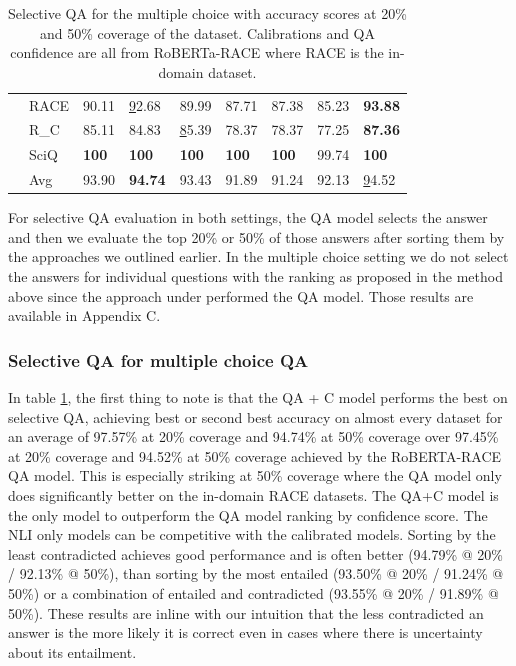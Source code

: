 \documentclass[11pt]{article}
\begin{document}
\begin{table}[]
\begin{tabular}{lllllllll}
 & RACE & 90.11 & {\ul 92.68} & 89.99 & 87.71 & 87.38 & 85.23 & \textbf{93.88} \\
 & R\_C & 85.11 & 84.83 & {\ul 85.39} & 78.37 & 78.37 & 77.25 & \textbf{87.36} \\
 & SciQ & \textbf{100} & \textbf{100} & \textbf{100} & \textbf{100} & \textbf{100} & 99.74 & \textbf{100} \\
 & Avg & 93.90 & \textbf{94.74} & 93.43 & 91.89 & 91.24 & 92.13 & {\ul 94.52} \\ \hline
\end{tabular}
\caption{Selective QA for the multiple choice with accuracy scores at 20\% and 50\% coverage of the dataset. Calibrations and QA confidence are all from RoBERTa-RACE where RACE is the in-domain dataset.}
\label{tab:selective_mc_qa}
\end{table}
For selective QA evaluation in both settings, the QA model selects the answer and then we evaluate the top 20\% or 50\% of those answers after sorting them by the approaches we outlined earlier. In the multiple choice setting we do not select the answers for individual questions with the ranking as proposed in the method above since the approach under performed the QA model. Those results are available in Appendix C.
\subsubsection{Selective QA for multiple choice QA}
In table \ref{tab:selective_mc_qa}, the first thing to note is that the QA + C model performs the best on selective QA, achieving best or second best accuracy on almost every dataset for an average of 97.57\% at 20\% coverage and 94.74\% at 50\% coverage over 97.45\% at 20\% coverage and 94.52\% at 50\% coverage achieved by the RoBERTA-RACE QA model. This is especially striking at 50\% coverage where the QA model only does significantly better on the in-domain RACE datasets. The QA+C model is the only model to outperform the QA model ranking by confidence score. The NLI only models can be competitive with the calibrated models. Sorting by the least contradicted achieves good performance and is often better (94.79\% @ 20\% / 92.13\% @ 50\%), than sorting by the most entailed (93.50\% @ 20\% / 91.24\% @ 50\%) or a combination of entailed and contradicted (93.55\% @ 20\% / 91.89\% @ 50\%). These results are inline with our intuition that the less contradicted an answer is the more likely it is correct even in cases where there is uncertainty about its entailment.
\end{document}

